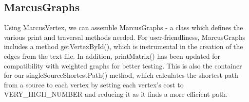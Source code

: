 \documentclass[letterpaper, 10pt]{article}
\begin{document}
\subsection{MarcusGraphs}

\hspace{1.0em}Using MarcusVertex, we can assemble MarcusGraphs - a class which defines the various print and traversal methods needed. For user-friendliness, MarcusGraphs includes a method getVertexById(), which is instrumental in the creation of the edges from the text file. In addition, printMatrix() has been updated for compatibility with weighted graphs for better testing. This is also the container for our singleSourceShortestPath() method, which calculates the shortest path from a source to each vertex by setting each vertex's cost to VERY\_HIGH\_NUMBER and reducing it as it finds a more efficient path.

\vspace{1.0em}
\end{document}
